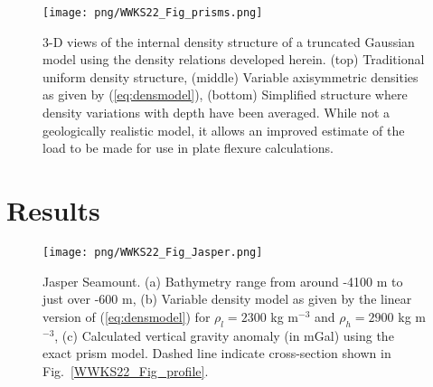 \begin{figure}[h]
\centering
\texttt{[image: png/WWKS22\_Fig\_prisms.png]}
\caption{3-D views of the internal density structure of a truncated Gaussian model using the density
relations developed herein. (top) Traditional uniform density structure, (middle) Variable axisymmetric densities
as given by (\ref{eq:densmodel}), (bottom) Simplified structure where density variations with depth
have been averaged.  While not a geologically realistic model, it allows an improved estimate of the load
to be made for use in plate flexure calculations.}
\label{WWKS22_Fig_prisms}
\end{figure}

\section{Results}

\begin{figure}[h]
\centering
\texttt{[image: png/WWKS22\_Fig\_Jasper.png]}
\caption{Jasper Seamount. (a) Bathymetry range from around -4100 m to just over -600 m, (b) Variable density model
as given by the linear version of (\ref{eq:densmodel}) for $\rho_l = 2300$ kg m$^{-3}$ and $\rho_h = 2900$ kg m$^{-3}$,
(c) Calculated vertical gravity anomaly (in mGal) using the exact prism model.  Dashed line indicate cross-section
shown in Fig.~\ref{WWKS22_Fig_profile}.}
\label{WWKS22_Fig_Jasper}
\end{figure}

